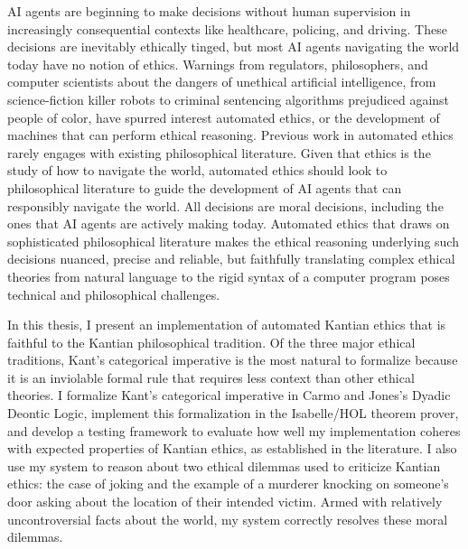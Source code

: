 %
\begin{isabellebody}%
%
%
\isadelimtheory
%
\endisadelimtheory
%
\isatagtheory
%
\endisatagtheory
{\isafoldtheory}%
%
\isadelimtheory
%
\endisadelimtheory
%
\begin{isamarkuptext}%
AI agents are beginning to make decisions without human supervision in increasingly consequential 
contexts like healthcare, policing, and driving. These decisions are inevitably ethically tinged, 
but most AI agents navigating the world today have no notion of ethics.
Warnings from regulators, philosophers, and computer scientists about the 
dangers of unethical artificial intelligence, from science-fiction killer robots to criminal
sentencing algorithms prejudiced against people of color, have spurred interest automated ethics, or the development 
of machines that can perform ethical reasoning. Previous work in automated ethics rarely
engages with existing philosophical literature. Given that ethics is the study of how to navigate the world,
automated ethics should look to philosophical literature to guide the development of AI agents that can
responsibly navigate the world. All decisions are moral decisions, including the ones that AI agents are actively 
making today. Automated ethics that draws on sophisticated philosophical literature makes the ethical reasoning
underlying such decisions nuanced, precise and reliable, but faithfully translating complex ethical theories
from natural language to the rigid syntax of a computer program poses technical and philosophical 
challenges. 

In this thesis, I present an implementation of automated Kantian
ethics that is faithful to the Kantian philosophical tradition. Of the three major ethical
traditions, Kant's categorical imperative is the most natural to formalize because it is an inviolable 
formal rule that requires less context than other ethical theories. I formalize Kant's categorical imperative 
in Carmo and Jones's Dyadic Deontic Logic, implement this formalization 
in the Isabelle/HOL theorem prover, and develop a testing framework to evaluate how well 
my implementation coheres with expected properties of Kantian ethics, as established in the literature. 
I also use my system to reason about two ethical dilemmas used to criticize Kantian ethics: the case of 
joking and the example of a murderer knocking on someone's door asking about the location of their
intended victim. Armed with relatively uncontroversial facts about the world, my system correctly 
resolves these moral dilemmas.


\end{isamarkuptext}
\end{isabellebody}
